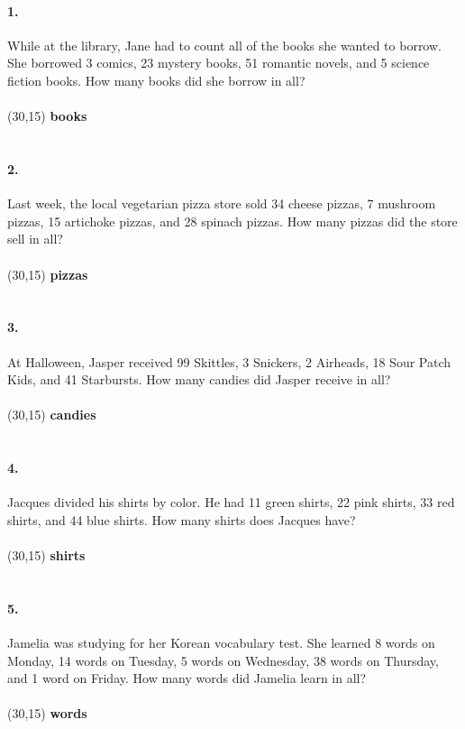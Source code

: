 \documentclass[12pt]{article}
\begin{document}
\paragraph{1.}
While at the library, Jane had to count all of the books she wanted to borrow. She borrowed 3 comics, 23 mystery books, 51 romantic novels, and 5 science fiction books. How many books did she borrow in all?
\\
\\
\framebox(30,15){} \textbf{books}
\\
\\
\paragraph{2.}
Last week, the local vegetarian pizza store sold 34 cheese pizzas, 7 mushroom pizzas, 15 artichoke pizzas, and 28 spinach pizzas. How many pizzas did the store sell in all?
\\
\\
\framebox(30,15){} \textbf{pizzas}
\\
\\
\paragraph{3.}
At Halloween, Jasper received 99 Skittles, 3 Snickers, 2 Airheads, 18 Sour Patch Kids, and 41 Starbursts. How many candies did Jasper receive in all?
\\
\\
\framebox(30,15){} \textbf{candies}
\\
\\
\paragraph{4.}
Jacques divided his shirts by color. He had 11 green shirts, 22 pink shirts, 33 red shirts, and 44 blue shirts. How many shirts does Jacques have?
\\
\\
\framebox(30,15){} \textbf{shirts}
\\
\\
\paragraph{5.}
Jamelia was studying for her Korean vocabulary test. She learned 8 words on Monday, 14 words on Tuesday, 5 words on Wednesday, 38 words on Thursday, and 1 word on Friday. How many words did Jamelia learn in all?
\\
\\
\framebox(30,15){} \textbf{words}
\end{document}

